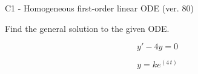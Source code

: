 \begin{exercise}
  \begin{exerciseTitle}C1 - Homogeneous first-order linear ODE (ver. 80)\end{exerciseTitle}
  \begin{exerciseStatement}
    
Find the general solution to the given ODE.

    
\[y'-4y=0\]

  \end{exerciseStatement}
  \begin{exerciseAnswer}
    
\[y= k e^{\left(4 \, t\right)}\]

  \end{exerciseAnswer}
\end{exercise}